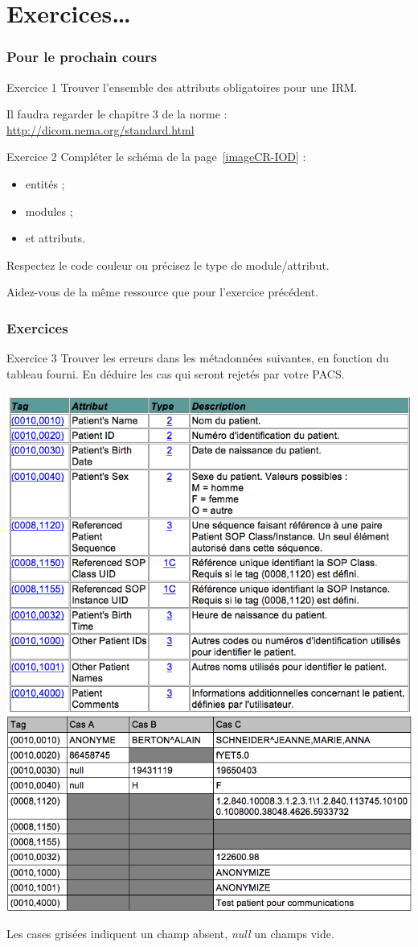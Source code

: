 \section{Exercices\ldots}

	\frame
	{
		\frametitle{Pour le prochain cours}
		
		{
			\begin{block}{Exercice 1}
				Trouver l'ensemble des attributs obligatoires pour une IRM.

				Il faudra regarder le chapitre 3 de la norme : \url{http://dicom.nema.org/standard.html}
			\end{block}
		}

		{
			\begin{block}{Exercice 2}
				Compl\'eter le sch\'ema de la page~\ref{imageCR-IOD} :
				\begin{itemize}
					\item entit\'es ;
					\item modules ;
					\item et attributs.
				\end{itemize}
				Respectez le code couleur ou pr\'ecisez le type de module/attribut.

				Aidez-vous de la m\^eme ressource que pour l'exercice pr\'ec\'edent.
			\end{block}
		}
	}

\frame
{
	\frametitle{Exercices}
	\begin{block}{Exercice 3}
    		Trouver les erreurs dans les m\'etadonn\'ees suivantes, en fonction du tableau fourni.
    		En d\'eduire les cas qui seront rejet\'es par votre PACS.

		\includegraphics[width=.5\linewidth]{./figures/table.png}
		\includegraphics[width=.5\linewidth]{./figures/metadata-cases.png}
    
    		Les cases gris\'ees indiquent un champ absent, \emph{null} un champs vide.
	\end{block}
}
